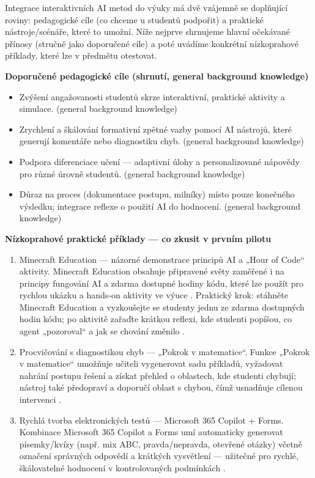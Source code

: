 \medskip

Integrace interaktivních AI metod do výuky má dvě vzájemně se doplňující roviny: pedagogické cíle (co chceme u studentů podpořit) a praktické nástroje/scénáře, které to umožní. Níže nejprve shrnujeme hlavní očekávané přínosy (stručně jako doporučené cíle) a poté uvádíme konkrétní nízkoprahové příklady, které lze v předmětu otestovat.

\smallskip
\textbf{Doporučené pedagogické cíle (shrnutí, general background knowledge)}  
\begin{itemize}
  \item Zvýšení angažovanosti studentů skrze interaktivní, praktické aktivity a simulace. (general background knowledge)
  \item Zrychlení a škálování formativní zpětné vazby pomocí AI nástrojů, které generují komentáře nebo diagnostiku chyb. (general background knowledge)
  \item Podpora diferenciace učení — adaptivní úlohy a personalizované nápovědy pro různé úrovně studentů. (general background knowledge)
  \item Důraz na proces (dokumentace postupu, milníky) místo pouze konečného výsledku; integrace reflexe o použití AI do hodnocení. (general background knowledge)
\end{itemize}

\smallskip
\textbf{Nízkoprahové praktické příklady — co zkusit v prvním pilotu}  

\begin{enumerate}
  \item Minecraft Education — názorné demonstrace principů AI a „Hour of Code“ aktivity.  
    Minecraft Education obsahuje připravené světy zaměřené i na principy fungování AI a zdarma dostupné hodiny kódu, které lze použít pro rychlou ukázku a hands‑on aktivity ve výuce \cite{kb_ai_101_tipu_pdf_04e4a115_page_15_2}. Praktický krok: stáhněte Minecraft Education a vyzkoušejte se studenty jednu ze zdarma dostupných hodin kódu; po aktivitě zařaďte krátkou reflexi, kde studenti popíšou, co agent „pozoroval“ a jak se chování změnilo \cite{kb_ai_101_tipu_pdf_04e4a115_page_15_2}.
  \item Procvičování s diagnostikou chyb — „Pokrok v matematice“.  
    Funkce „Pokrok v matematice“ umožňuje učiteli vygenerovat sadu příkladů, vyžadovat nahrání postupu řešení a získat přehled o oblastech, kde studenti chybují; nástroj také předopraví a doporučí oblast s chybou, čímž usnadňuje cílenou intervenci \cite{kb_ai_101_tipu_pdf_04e4a115_page_8_1}.
  \item Rychlá tvorba elektronických testů — Microsoft 365 Copilot + Forms.  
    Kombinace Microsoft 365 Copilot a Forms umí automaticky generovat písemky/kvízy (např. mix ABC, pravda/nepravda, otevřené otázky) včetně označení správných odpovědí a krátkých vysvětlení — užitečné pro rychlé, škálovatelné hodnocení v kontrolovaných podmínkách \cite{kb_ai_101_tipu_pdf_04e4a115_page_36_1}.
\end{enumerate}

